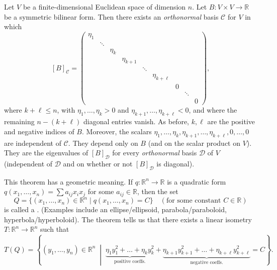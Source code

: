 \begin{theorem}
\label{thm:sylvesters_euclidean}
Let $V$ be a finite-di\-men\-sional Euclidean space of dimension $n$. Let $B \colon V \times V \to \mathbb{R}$ be a symmetric bilinear form. Then there exists an \emph{orthonormal} basis $\mathcal{C}$ for $V$ in which
\[
[B]_{\mathcal{C}} = \begin{pmatrix}
\eta_1 & & & & & & & & \\
& \ddots & & & & & & & \\
& & \eta_k & & & & & & \\
& & & \eta_{k+1} & & & & & \\
& & & & \ddots & & & & \\
& & & & & \eta_{k+\ell} & & & \\
& & & & & & 0 & & \\
& & & & & & & \ddots & \\
& & & & & & & & 0
\end{pmatrix},
\]
where $k + \ell \le n$, with $\eta_1, \dots, \eta_k > 0$ and $\eta_{k+1}, \dots, \eta_{k+\ell} < 0$, and where the remaining $n - (k+\ell)$ diagonal entries vanish. As before, $k, \ell$ are the positive and negative indices of $B$. Moreover, the scalars $\eta_1, \dots, \eta_k, \eta_{k+1}, \dots, \eta_{k+\ell}, 0, \dots, 0$ are independent of $\mathcal{C}$. They depend only on $B$ (and on the scalar product on $V$). They are the eigenvalues of $[B]_{\mathcal{D}}$ for every \emph{orthonormal} basis $\mathcal{D}$ of $V$ (independent of $\mathcal{D}$ and on whether or not $[B]_{\mathcal{D}}$ is diagonal).
\end{theorem}

\begin{remark}
This theorem has a geometric meaning.
If $q \colon \mathbb{R}^n \to \mathbb{R}$ is a quadratic form $q(x_1, \dots, x_n) = \sum a_{ij} x_i x_j$ for some $a_{ij} \in \mathbb{R}$, then the set
\[
Q = \{ (x_1, \dots, x_n) \in \mathbb{R}^n \mid q(x_1, \dots, x_n) = C \} \quad (\text{for some constant } C \in \mathbb{R})
\]
is called a . (Examples include an ellipse/ellipsoid, parabola/paraboloid, hyperbola/hyperboloid).
The theorem tells us that there exists a linear isometry $T \colon \mathbb{R}^n \to \mathbb{R}^n$ such that
\[
T(Q) = \left\{ (y_1, \dots, y_n) \in \mathbb{R}^n \;\middle|\; \underbrace{\eta_1 y_1^2 + \dots + \eta_k y_k^2}_{\text{positive coeffs.}} + \underbrace{\eta_{k+1} y_{k+1}^2 + \dots + \eta_{k+\ell} y_{k+\ell}^2}_{\text{negative coeffs.}} = C \right\}.
\]
\end{remark}

